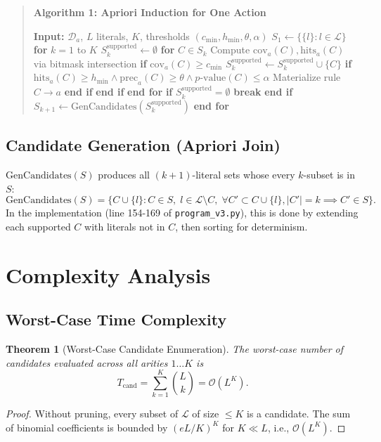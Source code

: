 \documentclass[11pt]{article}
\newcommand{\Oh}{\mathcal{O}}
\newcommand{\calD}{\mathcal{D}}
\newcommand{\calL}{\mathcal{L}}
\newtheorem{theorem}{Theorem}
\begin{document}
\begin{quote}
\textbf{Algorithm 1: Apriori Induction for One Action}

\textbf{Input:} $\calD_a$, $L$ literals, $K$, thresholds $(c_{\min}, h_{\min}, \theta, \alpha)$
$S_1 \gets \{\{l\} : l \in \calL\}$ 
\textbf{for} $k = 1$ to $K$
    $S_k^{\text{supported}} \gets \emptyset$
    \textbf{for} $C \in S_k$
        Compute $\mathrm{cov}_a(C), \mathrm{hits}_a(C)$ via bitmask intersection
        \textbf{if} $\mathrm{cov}_a(C) \geq c_{\min}$
            $S_k^{\text{supported}} \gets S_k^{\text{supported}} \cup \{C\}$
            \textbf{if} $\mathrm{hits}_a(C) \geq h_{\min} \land \mathrm{prec}_a(C) \geq \theta \land p\text{-value}(C) \leq \alpha$
                Materialize rule $C \to a$
            \textbf{end if}
        \textbf{end if}
    \textbf{end for}
    \textbf{if} $S_k^{\text{supported}} = \emptyset$ \textbf{break} \textbf{end if}
    $S_{k+1} \gets \mathrm{GenCandidates}(S_k^{\text{supported}})$ 
\textbf{end for}

\end{quote}

\subsection{Candidate Generation (Apriori Join)}
$\mathrm{GenCandidates}(S)$ produces all $(k+1)$-literal sets whose every $k$-subset is in $S$:
\[
\mathrm{GenCandidates}(S) = \{ C \cup \{l\} : C \in S,\; l \in \calL \setminus C,\; \forall C' \subset C \cup \{l\}, |C'|=k \implies C' \in S \}.
\]
In the implementation (line 154-169 of \texttt{program\_v3.py}), this is done by extending each supported $C$ with literals not in $C$, then sorting for determinism.

\section{Complexity Analysis}

\subsection{Worst-Case Time Complexity}

\begin{theorem}[Worst-Case Candidate Enumeration]
The worst-case number of candidates evaluated across all arities $1 \dots K$ is
\[
T_{\text{cand}} = \sum_{k=1}^K \binom{L}{k} = \Oh(L^K).
\]
\end{theorem}
\begin{proof}
Without pruning, every subset of $\calL$ of size $\leq K$ is a candidate. The sum of binomial coefficients is bounded by $(eL/K)^K$ for $K \ll L$, i.e., $\Oh(L^K)$.
\end{proof}
\end{document}

